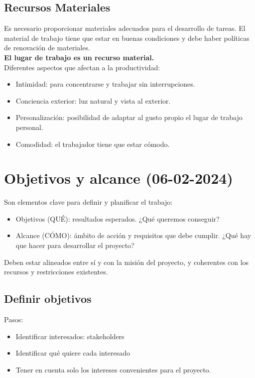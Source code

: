 \documentclass{article}
\begin{document}
\subsection{Recursos Materiales}
Es necesario proporcionar materiales adecuados para el desarrollo de tareas. El material de trabajo tiene que estar en buenas condiciones y debe haber políticas de renovación de materiales. \\
\textbf{El lugar de trabajo es un recurso material.}\\
Diferentes aspectos que afectan a la productividad:
\begin{itemize}
	\item Intimidad: para concentrarse y trabajar sin interrupciones.
	\item Conciencia exterior: luz natural y vista al exterior. 
	\item Personalización: posibilidad de adaptar al gusto propio el lugar de trabajo personal.
	\item Comodidad: el trabajador tiene que estar cómodo. 
\end{itemize}
\section{Objetivos y alcance (06-02-2024)}

Son elementos clave para definir y planificar el trabajo:
\begin{itemize}
	\item Objetivos (QUÉ): resultados esperados. ¿Qué queremos conseguir?
	\item Alcance (CÓMO): ámbito de acción y requisitos que debe cumplir. ¿Qué hay que hacer para desarrollar el proyecto?
\end{itemize}

Deben estar alineados entre sí y con la misión del proyecto, y coherentes con los recursos y restricciones existentes. 

\subsection{Definir objetivos}
Pasos:
\begin{itemize}
	\item Identificar interesados: stakeholders
	\item Identificar qué quiere cada interesado
	\item Tener en cuenta solo los intereses convenientes para el proyecto. 
\end{itemize}
\end{document}
